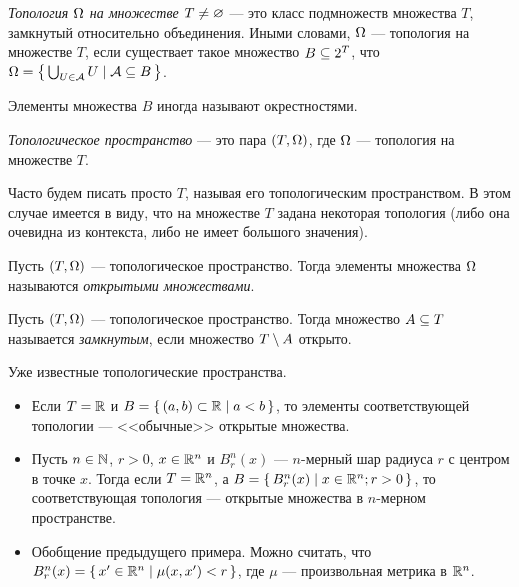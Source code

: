 \documentclass[main]{subfiles}
\begin{document}
\begin{definition}
	\emph{Топология $ \Omega $ на множестве $ T \neq \varnothing $} --- это класс подмножеств множества $ T $,
	замкнутый относительно объединения. Иными словами, $\Omega$ --- топология на множестве $ T $,
	если существает такое множество $ B \subseteq 2^T $,
	что $ \Omega = \left\{\, \bigcup_{U \in \mathcal{A}} U \mid \mathcal{A} \subseteq B \,\right\} $.
\end{definition}

\begin{remark}
	Элементы множества $ B $ иногда называют окрестностями.
\end{remark}

\begin{definition}
	\emph{Топологическое пространство} --- это пара $ (T, \Omega) $, где $ \Omega $ --- топология на множестве $ T $.
\end{definition}

\begin{remark}
	Часто будем писать просто $ T $, называя его топологическим пространством. В этом случае имеется в виду, что на
	множестве $ T $ задана некоторая топология (либо она очевидна из контекста, либо не имеет большого значения).
\end{remark}

\begin{definition}
	Пусть $ (T, \Omega) $ --- топологическое пространство.
	Тогда элементы множества $ \Omega $ называются \emph{открытыми множествами}.
\end{definition}

\begin{definition}
	Пусть $ (T, \Omega) $ --- топологическое пространство.
	Тогда множество $ A \subseteq T $ называется \emph{замкнутым}, если множество $ T \setminus A $ открыто.
\end{definition}

\begin{example} Уже известные топологические пространства.
	\begin{itemize}
		\item Если $ T = \mathbb{R} $ и $ B = \left\{\, (a, b) \subset \mathbb{R} \mid a < b \,\right\} $,
			то элементы соответствующей топологии ---
			<<обычные>> открытые множества.
		\item Пусть $ n \in \mathbb{N} $, $ r > 0 $, $ x \in \mathbb{R}^n $ и $ B^n_r(x) $ --- $ n $-мерный шар радиуса $ r $
			с центром в точке $ x $.
			Тогда если $ T = \mathbb{R}^n $, а $ B = \left\{\, B^n_r(x) \mid x \in \mathbb{R}^n; r > 0 \,\right\} $, то соответствующая топология ---
			открытые множества в $ n $-мерном пространстве.
		\item Обобщение предыдущего примера. Можно считать, что
			$ B^n_r(x) = \left\{\, x' \in \mathbb{R}^n \mid \mu(x, x') < r \,\right\} $,
			где $ \mu $ --- произвольная метрика в $ \mathbb{R}^n $.
	\end{itemize}
\end{example}
\end{document}
